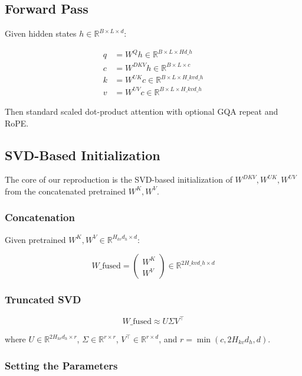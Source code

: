 \subsection{Forward Pass}

Given hidden states $h \in \mathbb{R}^{B \times L \times d}$:

\[
\begin{aligned}
q &= W^Q h \in \mathbb{R}^{B \times L \times H d\_h} \\
c &= W^{DKV} h \in \mathbb{R}^{B \times L \times c} \\
k &= W^{UK} c \in \mathbb{R}^{B \times L \times H\_{kv} d\_h} \\
v &= W^{UV} c \in \mathbb{R}^{B \times L \times H\_{kv} d\_h}
\end{aligned}
\tag{4.1}
\]

Then standard scaled dot-product attention with optional GQA repeat and 
RoPE.

\subsection{SVD-Based Initialization}

The core of our reproduction is the SVD-based initialization of 
$W^{DKV}, W^{UK}, W^{UV}$ from the concatenated pretrained $W^K, W^V$.

\subsubsection{Concatenation}

Given pretrained $W^K, W^V \in \mathbb{R}^{H_{kv} d_h \times d}$:

\[
W\_\text{fused} = \begin{pmatrix} W^K \\ W^V \end{pmatrix} \in \mathbb{R}^{2 H\_{kv} d\_h \times d}
\tag{4.2}
\]

\subsubsection{Truncated SVD}

\[
W\_\text{fused} \approx U \Sigma V^\top
\tag{4.3}
\]

where $U \in \mathbb{R}^{2 H_{kv} d_h \times r}$, $\Sigma \in \mathbb{R}^{r \times r}$, 
$V^\top \in \mathbb{R}^{r \times d}$, and $r = \min(c, 2 H_{kv} d_h, d)$.

\subsubsection{Setting the Parameters}

